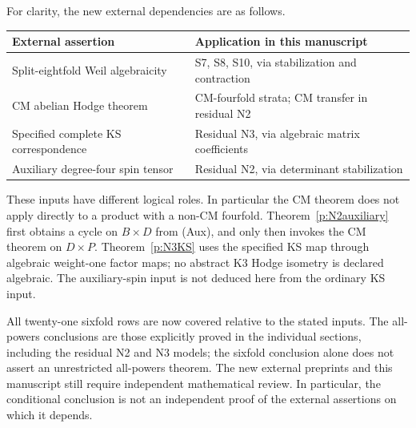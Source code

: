 \documentclass[11pt,reqno]{article}
\theoremstyle{emphasizedplain}
\theoremstyle{emphasizeddefinition}
\theoremstyle{emphasizeddefinition}
\begin{document}
For clarity, the new external dependencies are as follows.
\begin{center}
\begin{tabular}{>{\raggedright\arraybackslash}p{}
                >{\raggedright\arraybackslash}p{}}
\toprule
External assertion & Application in this manuscript\\
\midrule
Split-eightfold Weil algebraicity \cite{OpenAIEightfold}
 & S7, S8, S10, via stabilization and contraction\\
CM abelian Hodge theorem \cite{OpenAICM}
 & CM-fourfold strata; CM transfer in residual N2\\
Specified complete KS correspondence \cite{OpenAIKS}
 & Residual N3, via algebraic matrix coefficients\\
Auxiliary degree-four spin tensor \cite{OpenAIK3Products}
 & Residual N2, via determinant stabilization\\
\bottomrule
\end{tabular}
\end{center}

These inputs have different logical roles. In particular the CM
theorem does not apply directly to a product with a non-CM fourfold.
Theorem~\ref{p:N2auxiliary} first obtains a cycle on $B\times D$
from (Aux), and only then invokes the CM theorem on $D\times P$.
Theorem~\ref{p:N3KS} uses the specified KS map through algebraic
weight-one factor maps; no abstract K3 Hodge isometry is declared
algebraic. The auxiliary-spin input is not deduced here from the
ordinary KS input.

All twenty-one sixfold rows are now covered relative to the stated
inputs. The all-powers conclusions are those explicitly proved in
the individual sections, including the residual N2 and N3 models;
the sixfold conclusion alone does not assert an unrestricted
all-powers theorem. The new external preprints and this manuscript
still require independent mathematical review. In particular,
the conditional conclusion is not an independent proof of the
external assertions on which it depends.
\end{document}
